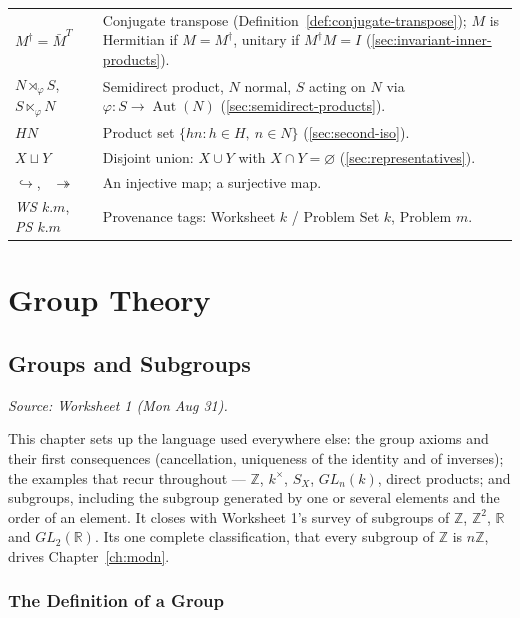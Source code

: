 \documentclass[11pt]{report}
\begin{document}
{\begin{longtable}{p{4.2cm}p{10.3cm}}
$M^\dagger = \bar M^T$ & Conjugate transpose (Definition~\ref{def:conjugate-transpose}); $M$ is Hermitian if $M = M^\dagger$, unitary if $M^\dagger M = I$ (\ref{sec:invariant-inner-products}). \\
$N \rtimes_\varphi S$, \ $S \ltimes_\varphi N$ & Semidirect product, $N$ normal, $S$ acting on $N$ via $\varphi: S \to \operatorname{Aut}(N)$ (\ref{sec:semidirect-products}). \\
$HN$ & Product set $\{hn : h \in H,\ n \in N\}$ (\ref{sec:second-iso}). \\
$X \sqcup Y$ & Disjoint union: $X \cup Y$ with $X \cap Y = \varnothing$ (\ref{sec:representatives}). \\
$\hookrightarrow$, \ $\twoheadrightarrow$ & An injective map; a surjective map. \\
\textit{WS $k.m$}, \textit{PS $k.m$} & Provenance tags: Worksheet $k$ / Problem Set $k$, Problem $m$. \\
\end{longtable}}

\part{Group Theory}

\chapter{Groups and Subgroups}


\textit{Source: Worksheet 1 (Mon Aug 31).}

This chapter sets up the language used everywhere else: the group axioms and their first consequences (cancellation, uniqueness of the identity and of inverses); the examples that recur throughout --- $\mathbb{Z}$, $k^\times$, $S_X$, $GL_n(k)$, direct products; and subgroups, including the subgroup generated by one or several elements and the order of an element. It closes with Worksheet 1's survey of subgroups of $\mathbb{Z}$, $\mathbb{Z}^2$, $\mathbb{R}$ and $GL_2(\mathbb{R})$. Its one complete classification, that every subgroup of $\mathbb{Z}$ is $n\mathbb{Z}$, drives Chapter~\ref{ch:modn}.

\section{The Definition of a Group}\label{sec:def-group}
\end{document}
